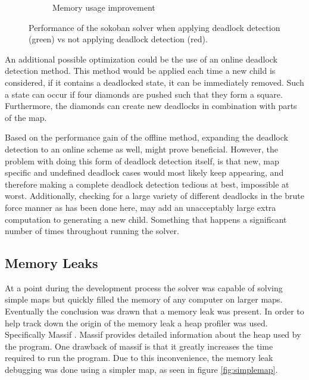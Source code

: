 \begin{figure}[H]
\begin{subfigure}{.5\textwidth}
  \caption{Memory usage improvement}
  \label{fig:sub2}
\end{subfigure}
\caption{Performance of the sokoban solver when applying deadlock detection (green) vs not applying deadlock detection (red).}
\label{fig:test}
\end{figure}
 
An additional possible optimization could be the use of an online deadlock detection method.
This method would be applied each time a new child is considered, if it contains a deadlocked state, it can be immediately removed.
Such a state can occur if four diamonds are pushed such that they form a square.
Furthermore, the diamonds can create new deadlocks in combination with parts of the map.
 
 


Based on the performance gain of the offline method, expanding the deadlock detection to an online scheme as well, might prove beneficial.
However, the problem with doing this form of deadlock detection itself, is that new, map specific and undefined deadlock cases would most likely keep appearing, and therefore making a complete deadlock detection tedious at best, impossible at worst.
Additionally, checking for a large variety of different deadlocks in the brute force manner as has been done here, may add an unacceptably large extra computation to generating a new child.
Something that happens a significant number of times throughout running the solver.

\subsection{Memory Leaks}
At a point during the development process the solver was capable of solving simple maps but quickly filled the memory of any computer on larger maps. Eventually the conclusion was drawn that a memory leak was present.
In order to help track down the origin of the memory leak a heap profiler was used. Specifically Massif \cite{massif}.
Massif provides detailed information about the heap used by the program.
One drawback of massif is that it greatly increases the time required to run the program.
Due to this inconvenience, the memory leak debugging was done using a simpler map, as seen in figure \ref{fig:simplemap}.


